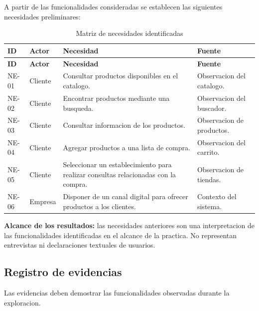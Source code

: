 \documentclass[11pt,a4paper]{article}
\begin{document}
A partir de las funcionalidades consideradas
se establecen las siguientes necesidades preliminares:

\begin{longtable}{p{1.5cm}p{3cm}p{6cm}p{3cm}}
\caption{Matriz de necesidades identificadas}\\
\toprule
\textbf{ID} &
\textbf{Actor} &
\textbf{Necesidad} &
\textbf{Fuente} \\
\midrule
\endfirsthead

\toprule
\textbf{ID} &
\textbf{Actor} &
\textbf{Necesidad} &
\textbf{Fuente} \\
\midrule
\endhead

NE-01 &
Cliente &
Consultar productos disponibles en el catalogo. &
Observacion del catalogo. \\

NE-02 &
Cliente &
Encontrar productos mediante una busqueda. &
Observacion del buscador. \\

NE-03 &
Cliente &
Consultar informacion de los productos. &
Observacion de productos. \\

NE-04 &
Cliente &
Agregar productos a una lista de compra. &
Observacion del carrito. \\

NE-05 &
Cliente &
Seleccionar un establecimiento para realizar
consultas relacionadas con la compra. &
Observacion de tiendas. \\

NE-06 &
Empresa &
Disponer de un canal digital para ofrecer
productos a los clientes. &
Contexto del sistema. \\

\bottomrule
\end{longtable}

\textbf{Alcance de los resultados:}
las necesidades anteriores son una interpretacion
de las funcionalidades identificadas en el alcance
de la practica. No representan entrevistas ni
declaraciones textuales de usuarios.

\subsection{Registro de evidencias}

Las evidencias deben demostrar las funcionalidades
observadas durante la exploracion.
\end{document}
